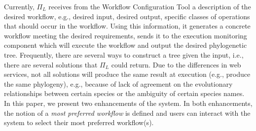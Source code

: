 \documentclass{new_tlp}
\begin{document}
Currently, $\Pi_L$ receives from the Workflow Configuration Tool a description of the desired workflow, e.g., 
desired input, desired output, specific classes of operations that should occur in the workflow.
Using
this information, it generates 
a concrete workflow meeting the desired requirements, 
sends it to the execution monitoring component which will execute the workflow and output 
the desired phylogenetic tree.  Frequently, there are several ways to construct a tree given the input, i.e., 
there are several solutions that $\Pi_L$ could return. Due to the differences in web services, 
not all solutions will produce the same result at execution (e.g., produce the same phylogeny), e.g., because of lack of agreement on the
evolutionary relationships between certain species or the ambiguity of certain species names. 
 In this paper, we present two enhancements of the 
system. In both enhancements, the notion of a \emph{most preferred workflow} is defined and 
users can interact with the system to select their most preferred workflow(s). 
\end{document}
